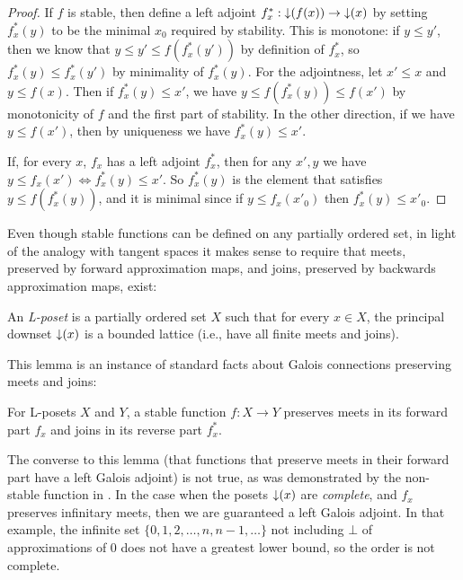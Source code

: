 \begin{proof}
  If $f$ is stable, then define a left adjoint
  $f^*_x : \mathop{\downarrow}(f(x)) \to \mathop{\downarrow}(x)$ by setting $f^*_x(y)$ to be
  the minimal $x_0$ required by stability. This is monotone: if
  $y \leq y'$, then we know that $y \leq y' \leq f(f^*_x(y'))$ by
  definition of $f^*_x$, so $f^*_x(y) \leq f^*_x(y')$ by minimality of
  $f^*_x(y)$. For the adjointness, let $x' \leq x$ and $y \leq
  f(x)$. Then if $f^*_x(y) \leq x'$, we have
  $y \leq f(f^*_x(y)) \leq f(x')$ by monotonicity of $f$ and the first
  part of stability. In the other direction, if we have
  $y \leq f(x')$, then by uniqueness we have $f^*_x(y) \leq x'$.

  If, for every $x$, $f_x$ has a left adjoint $f^*_x$, then for any
  $x', y$ we have $y \leq f_x(x') \Leftrightarrow f^*_x(y) \leq
  x'$. So $f^*_x(y)$ is the element that satisfies
  $y \leq f(f^*_x(y))$, and it is minimal since if $y \leq f_x(x'_0)$
  then $f^*_x(y) \leq x'_0$.
\end{proof}

Even though stable functions can be defined on any partially ordered
set, in light of the analogy with tangent spaces it makes sense to
require that meets, preserved by forward approximation maps, and
joins, preserved by backwards approximation maps, exist:

\begin{definition}
  An \emph{L-poset} is a partially ordered set $X$ such that for every $x \in X$, the principal downset $\mathop{\downarrow}(x)$ is a bounded lattice (i.e., have all finite meets and joins).
\end{definition}

This lemma is an instance of standard facts about Galois connections
preserving meets and joins:

\begin{lemma}
  For L-posets $X$ and $Y$, a stable function $f : X \to Y$ preserves
  meets in its forward part $f_x$ and joins in its reverse part
  $f^*_x$.
\end{lemma}

The converse to this lemma (that functions that preserve meets in their forward part have a left Galois adjoint) is not true, as was demonstrated by the non-stable function in . In the case when the posets $\mathop{\downarrow}(x)$ are \emph{complete}, and $f_x$ preserves infinitary meets, then we are guaranteed a left Galois adjoint. In that example, the infinite set $\{0, 1, 2, \dots, n, n-1, \dots\}$ not including $\bot$ of approximations of $0$ does not have a greatest lower bound, so the order is not complete.


